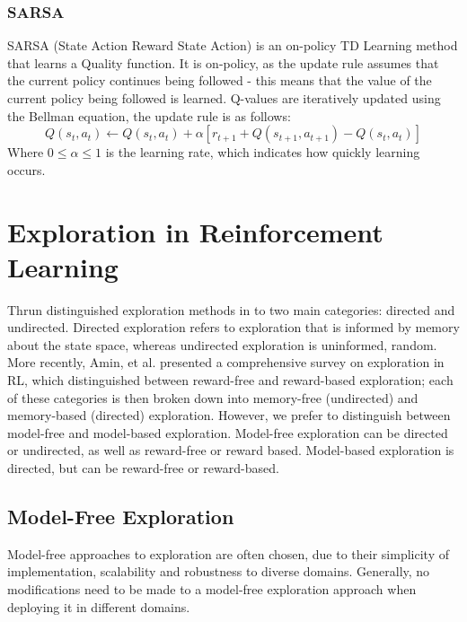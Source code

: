 \subsubsection{SARSA}
SARSA (State Action Reward State Action) \cite{rummery:cuedtr94} is an on-policy TD Learning method that learns a Quality function. It is on-policy, as the update rule assumes that the current policy continues being followed - this means that the value of the current policy being followed is learned. Q-values are iteratively updated using the Bellman equation, the update rule is as follows:
\begin{equation}
\label{eqn:sarsaupdate}
Q(s_t, a_t) \leftarrow Q(s_t, a_t) + \alpha[r_{t+1} + Q(s_{t+1}, a_{t+1})-Q(s_t, a_t)]
\end{equation}
Where $0 \le \alpha \le 1$ is the learning rate, which indicates how quickly learning occurs.
\section{Exploration in Reinforcement Learning}
Thrun \cite{Thrun-1992-15850} distinguished exploration methods in to two main categories: directed and undirected. Directed exploration refers to exploration that is informed by memory about the state space, whereas undirected exploration is uninformed, random. More recently, Amin, et al. \cite{DBLP:journals/corr/abs-2109-00157} presented a comprehensive survey on exploration in RL, which distinguished between reward-free and reward-based exploration; each of these categories is then broken down into memory-free (undirected) and memory-based (directed) exploration. However, we prefer to distinguish between model-free and model-based exploration. Model-free exploration can be directed or undirected, as well as reward-free or reward based. Model-based exploration is directed, but can be reward-free or reward-based.
\subsection{Model-Free Exploration}
Model-free approaches to exploration are often chosen, due to their simplicity of implementation, scalability and robustness to diverse domains. Generally, no modifications need to be made to a model-free exploration approach when deploying it in different domains.
